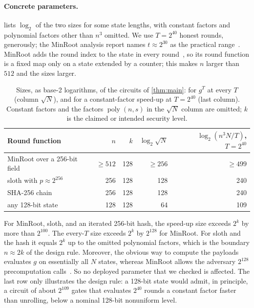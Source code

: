 \documentclass[11pt]{article}
\theoremstyle{definition}
\theoremstyle{remark}
\newcommand{\poly}{\operatorname{poly}}
\numberwithin{equation}{section}
\begin{document}
\paragraph{Concrete parameters.}
 lists $\log_2$ of the two sizes for some state lengths,
with constant factors and polynomial factors other than $n^3$ omitted.
We use $T=2^{40}$ honest rounds, generously; the MinRoot analysis report
names $t\approx2^{30}$ as the practical range~\cite[Section~4.2.4]{MinRoot23}.
MinRoot adds the round index to the state in every
round~\cite[Section~4.1.2]{MinRoot23}, so its round function is a fixed map
only on a state extended by a counter; this makes $n$ larger than $512$ and
the sizes larger.

\begin{table}[htbp]
\centering
\small
\begin{tabular}{@{}lrrrr@{}}
\toprule
Round function & $n$ & $k$ & $\log_2\sqrt N$ & $\log_2(n^3N/T)$, $T=2^{40}$ \\
\midrule
MinRoot over a 256-bit field & $\geq512$ & 128 & $\geq256$ & $\geq499$ \\
sloth with $p\approx2^{256}$ & 256 & 128 & 128 & 240 \\
SHA-256 chain & 256 & 128 & 128 & 240 \\
any 128-bit state & 128 & 128 & 64 & 109 \\
\bottomrule
\end{tabular}
\caption{Sizes, as base-2 logarithms, of the circuits of \cref{thm:main}:
for $g^T$ at every $T$ (column $\sqrt N$), and for a constant-factor
speed-up at $T=2^{40}$ (last column).  Constant factors and the factors
$\poly(n,s)$ in the $\sqrt N$ column are omitted; $k$ is the claimed or
intended security level.}
\label{tab:crypto}
\end{table}

For MinRoot, sloth, and an iterated 256-bit hash, the speed-up size exceeds
$2^{k}$ by more than $2^{100}$.  The every-$T$ size exceeds $2^k$ by
$2^{128}$ for MinRoot.  For sloth and the hash it equals $2^k$ up to the
omitted polynomial factors, which is the boundary $n\approx2k$ of the
design rule.  Moreover, the obvious way to compute the
payloads evaluates $g$ on essentially all $N$ states, whereas MinRoot
allows the adversary $2^{128}$ precomputation calls~\cite{KMT22}.  So no
deployed parameter that we checked is affected.  The last row only
illustrates the design rule: a 128-bit state would admit, in principle,
a circuit of about $2^{109}$ gates that evaluates $2^{40}$ rounds a constant
factor faster than unrolling, below a nominal 128-bit nonuniform level.
\end{document}

